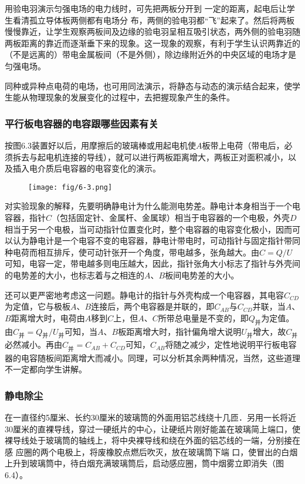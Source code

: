 用验电羽演示匀强电场的电力线时，可先把两板分开到
一定的距离，起电后让学生看清孤立导体板两侧都有电场分
布，两侧的验电羽都“飞”起来了。然后将两板慢慢靠近，让学生观察两板间及边缘的验电羽呈相互吸引状态，两外侧的验电羽随两板距离的靠近而逐渐垂下来的现象。这一现象的观察，有利于学生认识两靠近的（不是远离的）带电金属板间（不是外侧），除边缘附近外的中央区域的电场才是匀强电场。

同种或异种点电荷的电场，也可用同法演示，将静态与动态的演示结合起来，使学生能从物理现象的发展变化的过程中，去把握现象产生的条件。

\subsubsection{平行板电容器的电容跟哪些因素有关}
按图6.3装置好以后，用摩擦后的玻璃棒或用起电机使$A$板带上电荷（带电后，必须拆去与起电机连接的导线），就可以进行两板距离增大，两板正对面积减小，以及插入电介质后电容器的电容变化的演示。
\begin{figure}[htp]
    \centering
   \texttt{[image: fig/6-3.png]}
    \caption{}
\end{figure}

对实验现象的解释，先要明确静电计为什么能测电势差。静电计本身相当于一个电容器，指针$C$（包括固定针、金属杆、金属球）相当于电容器的一个电极，外壳$D$相当于另一个电极，当可动指针位置变化时，整个电容器的电容变化极小，因而可
以认为静电计是一个电容不变的电容器，静电计带电时，可动指针与固定指针带同种电荷而相互排斥，使可动针张开一个角度，带电越多，张角越大。由$C=Q/U$可知，电容一定，带电越多则电压越大，因此，指针张角大小标志了指针与外壳间的电势差的大小，也标志着与之相连的$A$、$B$板间电势差的大小。

还可以更严密地考虑这一问题。静电计的指针与外壳构成一个电容器，其电容$C_{CD}$为定值，它与极板$A$、$B$连接后，两个电容器是并联的，即$C_{AB}$与$C_{CD}$并联，当$A$、$B$距离增大时，电荷由$A$移到$C$上，但$A$、$C$所带总电量是不变的，即$Q_{\text{并}}$为定值。由$C_{\text{并}}=Q_{\text{并}}/U_{\text{并}}$可知，当$A$、$B$板距离增大时，指针偏角增大说明$U_{\text{并}}$增大，故$C_{\text{并}}$必然减小。再由$C_{\text{并}}=C_{AB}+C_{CD}$可知，$C_{AB}$将随之减少，定性地说明平行板电容器的电容随板间距离增大而减小。同理，可以分析其余两种情况，当然，这些道理不一定都向学生讲解。

\subsubsection{静电除尘}

在一直径约5厘米、长约30厘米的玻璃筒的外面用铝芯线绕十几匝．另用一长将近30厘米的直裸导线，穿过一硬纸片的中心，让硬纸片刚好能盖在玻璃简上端口，使裸导线处于玻璃筒的轴线上，将中央裸导线和绕在外面的铝芯线的一端，分别接在感
应圈的两个电极上，将废橡胶点燃后吹灭，放在玻璃筒下端
口，使冒出的白烟上升到玻璃筒中，待白烟充满玻璃筒后，启动感应圈，筒中烟雾立即消失（图6.4）。

